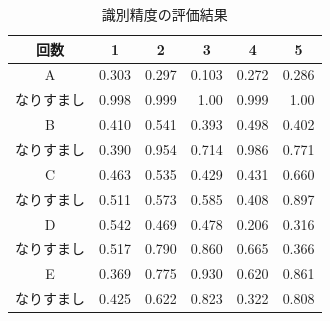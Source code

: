 \begin{table}[btph]
  \centering
  \caption{識別精度の評価結果}
  \label{auth-result}
  \begin{tabular}{|c|r|r|r|r|r|} \hline
    \multicolumn{1}{|c|}{回数} & \multicolumn{1}{c|}{1} & \multicolumn{1}{c|}{2} & \multicolumn{1}{c|}{3} & \multicolumn{1}{c|}{4} & \multicolumn{1}{c|}{5} \\ \hline
    A & 0.303 & 0.297 & 0.103 & 0.272 & 0.286 \\
    なりすまし & 0.998 & 0.999 & 1.00 & 0.999 & 1.00 \\ \hline
    B & 0.410 & 0.541 & 0.393 & 0.498 & 0.402 \\
    なりすまし & 0.390 & 0.954 & 0.714 & 0.986 & 0.771 \\ \hline
    C & 0.463 & 0.535 & 0.429 & 0.431 & 0.660 \\ %
    なりすまし & 0.511 & 0.573 & 0.585 & 0.408 & 0.897 \\ \hline
    D & 0.542 & 0.469 & 0.478 & 0.206 & 0.316 \\
    なりすまし & 0.517 & 0.790 & 0.860 & 0.665 & 0.366 \\ \hline
    E & 0.369 & 0.775 & 0.930 & 0.620 & 0.861 \\
    なりすまし & 0.425 & 0.622 & 0.823 & 0.322 & 0.808 \\ \hline

\end{tabular}
\end{table}
